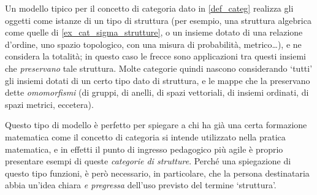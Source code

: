 \begin{remark}\label{frecce_o_morfismi}
	Un modello tipico per il concetto di categoria dato in \ref{def_categ} realizza gli oggetti come istanze di un tipo di struttura (per esempio, una struttura algebrica come quelle di \ref{ex_cat_sigma_strutture}, o un insieme dotato di una relazione d'ordine, uno spazio topologico, con una misura di probabilità, metrico\dots), e ne considera la totalità; in questo caso le frecce sono applicazioni tra questi insiemi che \emph{preservano} tale struttura. Molte categorie quindi nascono considerando `tutti' gli insiemi dotati di un certo tipo dato di struttura, e le mappe che la preservano dette \emph{omomorfismi} (di gruppi, di anelli, di spazi vettoriali, di insiemi ordinati, di spazi metrici, eccetera).

	Questo tipo di modello è perfetto per spiegare a chi ha già una certa formazione matematica come il concetto di categoria si intende utilizzato nella pratica matematica, e in effetti il punto di ingresso pedagogico più agile è proprio presentare esempi di queste \emph{categorie di strutture}. Perché una spiegazione di questo tipo funzioni, è però necessario, in particolare, che la persona destinataria abbia un'idea chiara \emph{e pregressa} dell'uso previsto del termine `struttura'.


\end{remark}
